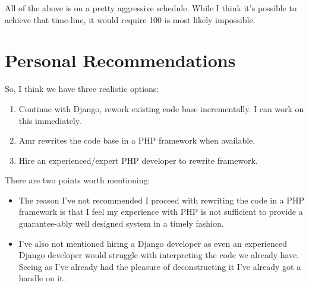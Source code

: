 \documentclass[12pt]{article}
\begin{document}
All of the above is on a pretty aggressive schedule. While I think it's possible
to achieve that time-line, it would require 100%
is most likely impossible.

\section{Personal Recommendations}

So, I think we have three realistic options:

\begin{enumerate}
\item Continue with Django, rework existing code base incrementally. I can work on this
      immediately.
\item Amr rewrites the code base in a PHP framework when available.
\item Hire an experienced/expert PHP developer to rewrite framework.
\end{enumerate}

There are two points worth mentioning:

\begin{itemize}
\item The reason I've not recommended I proceed with rewriting the code in a PHP framework
      is that I feel my experience with PHP is not sufficient to provide a guarantee-ably 
      well designed system in a timely fashion.
\item I've also not mentioned hiring a Django developer as even an experienced Django developer
      would struggle with interpreting the code we already have. Seeing as I've already had
      the pleasure of deconstructing it I've already got a handle on it.
\end{itemize}
\end{document}
